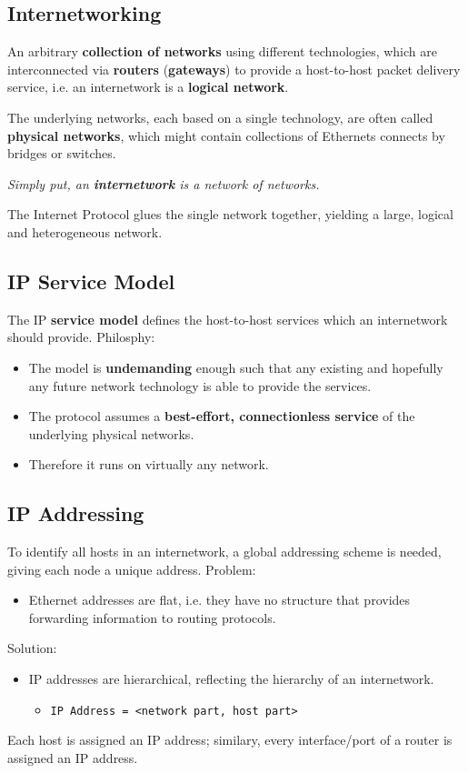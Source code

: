 \documentclass{article}%
\begin{document}
\subsection{Internetworking}
\label{sec:org8c2d194}
\begin{description}
\item[{Internetwork}] An arbitrary \textbf{collection of networks} using different technologies, which are interconnected via \textbf{routers} (\textbf{gateways}) to provide a host-to-host packet delivery service, i.e. an internetwork is a \textbf{logical network}.
\item The underlying networks, each based on a single technology, are often called \textbf{physical networks}, which might contain collections of Ethernets connects by bridges or switches.
\item \emph{Simply put, an \textbf{internetwork} is a network of networks.}
\item The Internet Protocol glues the single network together, yielding a large, logical and heterogeneous network.
\end{description}

\subsection{IP Service Model}
\label{sec:org521e7ba}
The IP \textbf{service model} defines the host-to-host services which an internetwork should provide.
Philosphy:
\begin{itemize}
\item The model is \textbf{undemanding} enough such that any existing and hopefully any future network technology is able to provide the services.
\item The protocol assumes a \textbf{best-effort, connectionless service} of the underlying physical networks.
\item Therefore it runs on virtually any network.
\end{itemize}

\subsection{IP Addressing}
\label{sec:orgce6f7f2}
To identify all hosts in an internetwork, a global addressing scheme is needed, giving each node a unique address.
Problem:
\begin{itemize}
\item Ethernet addresses are flat, i.e. they have no structure that provides forwarding information to routing protocols.
\end{itemize}
Solution:
\begin{itemize}
\item IP addresses are hierarchical, reflecting the hierarchy of an internetwork.
\begin{itemize}
\item \texttt{IP Address = <network part, host part>}
\end{itemize}
\end{itemize}
Each host is assigned an IP address; similary, every interface/port of a router is assigned an IP address.
\end{document}
